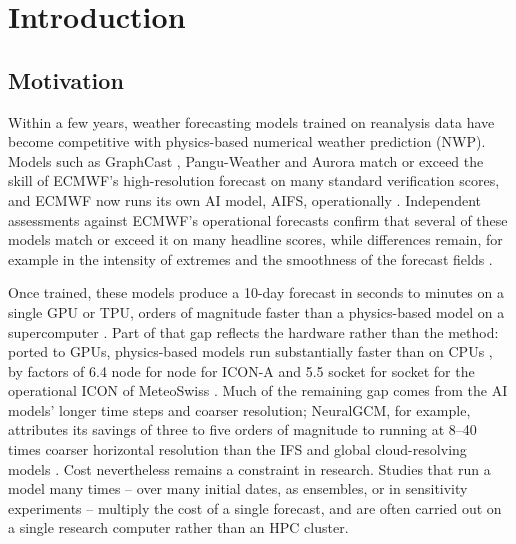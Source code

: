 \section{Introduction}
\label{sec:introduction}

\subsection{Motivation}
\label{sec:intro-motivation}

 Within a few
years, weather forecasting models trained on reanalysis data have become
competitive with physics-based numerical weather prediction (NWP). Models
such as GraphCast \citep{lam2023graphcast}, Pangu-Weather
\citep{bi2023pangu} and Aurora \citep{bodnar2024aurora} match or exceed
the skill of ECMWF's high-resolution forecast on many standard
verification scores, and ECMWF now runs its own AI model, AIFS,
operationally \citep{lang2024aifs, ecmwf2026aifscard}. Independent assessments
against ECMWF's operational forecasts confirm that several of these models
match or exceed it on many headline scores, while differences remain, for
example in the intensity of extremes and the smoothness of the forecast
fields \citep{rasp2024weatherbench2, benbouallegue2024rise}.

Once trained, these models produce a 10-day forecast in seconds to
minutes on a single GPU or TPU, orders of magnitude faster than a
physics-based model on a supercomputer \citep{pathak2022fourcastnet,
bi2023pangu, lam2023graphcast}. Part of that gap reflects
the hardware rather than the method: ported to GPUs, physics-based models
run substantially faster than on CPUs \citep{fuhrer2018near}, by factors
of 6.4 node for node for ICON-A \citep{giorgetta2022icon} and 5.5
socket for socket for the operational ICON of MeteoSwiss
\citep{lapillonne2026icon}. Much of the remaining gap comes from the AI
models' longer time steps and coarser resolution; NeuralGCM, for example,
attributes its savings of three to five orders of magnitude to running at
8--40 times coarser horizontal resolution than the IFS and global
cloud-resolving models \citep{kochkov2024neural}. Cost nevertheless remains a constraint in research.
Studies that run a model many times -- over many initial dates, as
ensembles, or in sensitivity experiments -- multiply the cost of a
single forecast, and are often carried out on a single research computer
rather than an HPC cluster.

